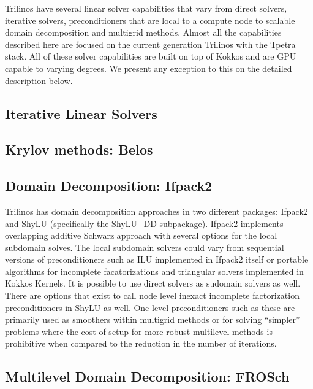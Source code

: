 
Trilinos have several linear solver capabilities that vary from direct solvers, iterative solvers, preconditioners that are local to a compute node to scalable domain decomposition and multigrid methods. Almost all the capabilities described here are focused on the current generation Trilinos with the Tpetra stack. All of these solver capabilities are built on top of Kokkos and are GPU capable to varying degrees. We present any exception to this on the detailed description below.

\subsection{Iterative Linear Solvers}

\subsection{Krylov methods: Belos}

\subsection{Domain Decomposition: Ifpack2}

Trilinos has domain decomposition approaches in two different packages: Ifpack2 and ShyLU (specifically the ShyLU\_DD subpackage). Ifpack2 implements overlapping additive Schwarz approach with several options for the local subdomain solves. The local subdomain solvers could vary from sequential versions of preconditioners such as ILU implemented in Ifpack2 itself or portable algorithms for incomplete facatorizations and triangular solvers implemented in Kokkos Kernels. It is possible to use direct solvers as sudomain solvers as well. There are options that exist to call node level inexact incomplete factorization preconditioners in ShyLU as well. One level preconditioners such as these are primarily used as smoothers within multigrid methods or for solving ``simpler'' problems where the cost of setup for more robust multilevel methods is  prohibitive when compared to the reduction in the number of iterations.


\subsection{Multilevel Domain Decomposition: FROSch}
\label{ssec:frosch}

